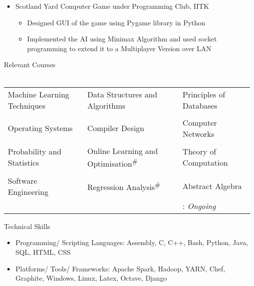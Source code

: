 \documentclass{article}
\begin{document}
\begin{itemize}[leftmargin=0.07cm]
\item[] {\large Scotland Yard Computer Game under} {\large Programming Club, IITK}\hspace*{\fill}
	\begin{itemize}
	\item Designed GUI of the game using Pygame library in Python
	\item Implemented the AI using Minimax Algorithm and used socket programming to extend it to a Multiplayer Version over LAN
	\end{itemize}
	\end{itemize}
{\Large Relevant Courses}\\\\
\begin{tabular}{p{6cm} p{6cm} p{6cm}}
Machine Learning Techniques & Data Structures and Algorithms & Principles of Databases\\\\\vspace{-0.4cm}Operating Systems &\vspace{-0.4cm} Compiler Design &\vspace{-0.4cm} Computer Networks \\\\\vspace{-0.5cm}Probability and Statistics & \vspace{-0.5cm}Online Learning and Optimisation\textsuperscript{\#} & \vspace{-0.5cm}Theory of Computation\\\\
\vspace{-0.6cm}Software Engineering & \vspace{-0.6cm}Regression Analysis\textsuperscript{\#} & \vspace{-0.6cm}Abstract Algebra\\ & & \vspace{-0.5cm}\hspace{1cm}{\#}: \emph{Ongoing}\\
\end{tabular}
{\Large Technical Skills}\\
\renewcommand{\labelitemi}{$\bullet$}
\begin{itemize}[leftmargin=0.82cm]
\item Programming/ Scripting Languages: Assembly, C, C++, Bash, Python, Java, SQL, HTML, CSS
\item Platforms/ Tools/ Frameworks: Apache Spark, Hadoop, YARN,  Chef, Graphite, Windows, Linux, Latex, Octave, Django
\end{itemize}
\end{document}
